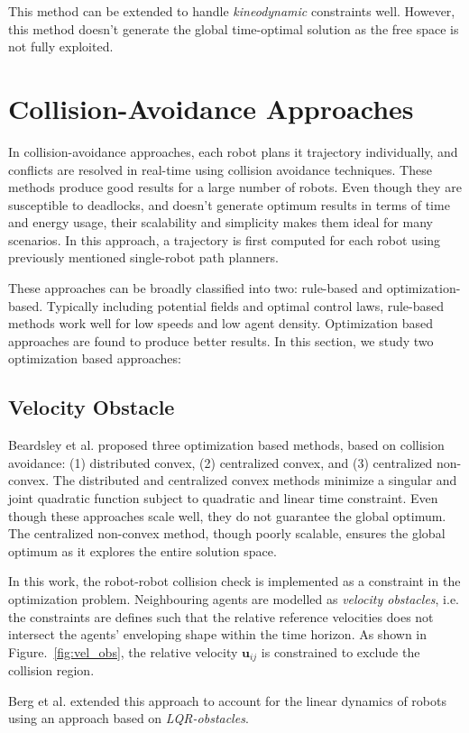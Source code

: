 This method can be extended to handle \textit{kineodynamic} constraints well. However, this method doesn't generate the global time-optimal solution as the free space is not fully exploited.
\section{Collision-Avoidance Approaches}
In collision-avoidance approaches, each robot plans it trajectory individually, and conflicts are resolved in real-time using collision avoidance techniques. These methods produce good results for a large number of robots. Even though they are susceptible to deadlocks, and doesn't generate optimum results in terms of time and energy usage, their scalability and simplicity makes them ideal for many scenarios. In this approach, a trajectory is first computed for each robot using previously mentioned single-robot path planners. 

These approaches can be broadly classified into two: rule-based and optimization-based. Typically including potential fields and optimal control laws, rule-based methods work well for low speeds and low agent density. Optimization based approaches are found to produce better results. In this section, we study two optimization based approaches:
\subsection{Velocity Obstacle}
Beardsley et al. \cite{alonso2015collision} proposed three optimization based methods, based on collision avoidance: (1) distributed convex, (2) centralized convex, and (3) centralized non-convex. The distributed and centralized convex methods minimize a singular and joint quadratic function subject to quadratic and linear time constraint. Even though these approaches scale well, they do not guarantee the global optimum. The centralized non-convex method, though poorly scalable, ensures the global optimum as it explores the entire solution space. 

In this work, the robot-robot collision check is implemented as a constraint in the optimization problem. Neighbouring agents are modelled as \textit{velocity obstacles}, i.e. the constraints are defines such that the relative reference velocities does not intersect the agents' enveloping shape within the time horizon. As shown in Figure.~\ref{fig:vel_obs}, the relative velocity $\textbf{u}_{ij}$ is constrained to exclude the collision region. 

Berg et al. \cite{bareiss2013reciprocal} extended this approach to account for the linear dynamics of robots using an approach based on \textit{LQR-obstacles}.

